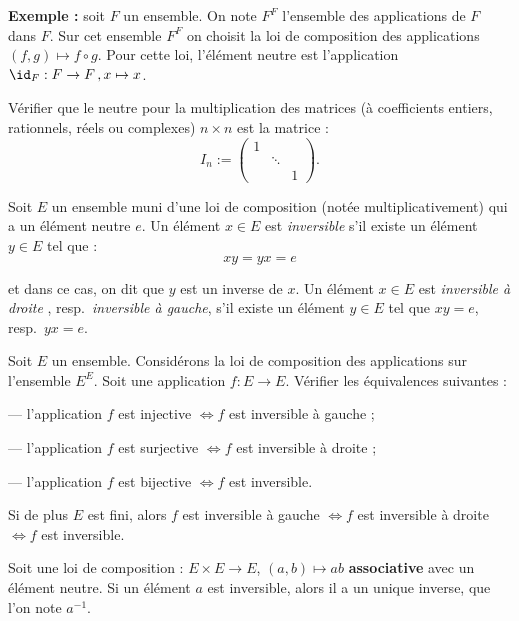 \documentclass[class=report,crop=false]{standalone}
\begin{document}
{\bf Exemple :} soit $F$ un ensemble. On note $F^F$ l'ensemble des applications de $F$ dans $F$. Sur cet ensemble $F^F$ on choisit la loi de composition des applications $(f,g) \mapsto f \circ g$. Pour cette loi, l'élément neutre est l'application $\id_F : F \to F\,, x \mapsto x$.

\begin{exercicecours}
Vérifier que le neutre pour la multiplication des matrices (à coefficients entiers, rationnels, réels ou complexes) $n \times n$ est la matrice :
\[  I_n := \left(\begin{array}{ccc}
1 & &\\
& \ddots &\\
&&1
\end{array}\right).\]\end{exercicecours}

\begin{definition}
Soit $E$ un ensemble muni d'une loi de composition (notée multiplicativement) qui a un élément neutre $e$. Un élément $x \in E$ est {\it inversible}  s'il existe un élément $y \in E$ tel que :
\[xy =yx =e \]

et dans ce cas, on dit que $y$ est un inverse de $x$.
Un élément $x \in E$ est {\it inversible à droite} , resp.\  {\it inversible à gauche}, s'il existe un élément $y \in E$ tel que $xy  =e$, resp.\ $yx=e$.

\end{definition}

\begin{exercicecours}
Soit $E$ un ensemble. Considérons la loi de composition des applications sur l'ensemble $E^E$. Soit une application $f : E \to E$. Vérifier les équivalences suivantes :

--- l'application $f$ est injective $\iff f$ est inversible à gauche ;

---  l'application $f$ est surjective $\iff f$ est inversible à droite ;

--- l'application $f$ est bijective $\iff f$ est inversible.

Si de plus $E$ est fini, alors $f$ est inversible à gauche $\iff f$ est inversible à droite $\iff f$ est inversible.
\end{exercicecours}

\begin{proposition}
Soit une loi de composition : $E \times E \to E$, $(a,b) \mapsto ab$ {\bf associative} avec un élément neutre. Si un élément $a $ est inversible, alors il a un unique inverse, que l'on note $a^{-1}$. 
\end{proposition}
\end{document}
